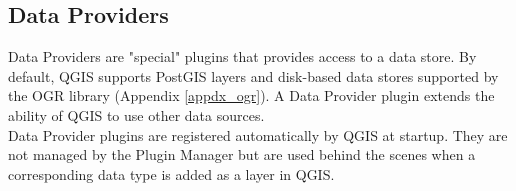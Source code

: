 \documentclass[10pt,english]{article}
\begin{document}
\begin{onehalfspace}
\begin{Tip}
{}
\end{Tip} 

\subsection{Data Providers}
Data Providers are "special" plugins that provides access to a data store. By default, QGIS supports PostGIS layers and disk-based data stores supported by the OGR library (Appendix \ref{appdx_ogr}). A Data Provider plugin extends the ability of QGIS to use other data sources.\\

Data Provider plugins are registered automatically by QGIS at startup. They are not managed by the Plugin Manager but are used behind the scenes when a corresponding data type is added as a layer in QGIS.

\end{onehalfspace}
\end{document}
